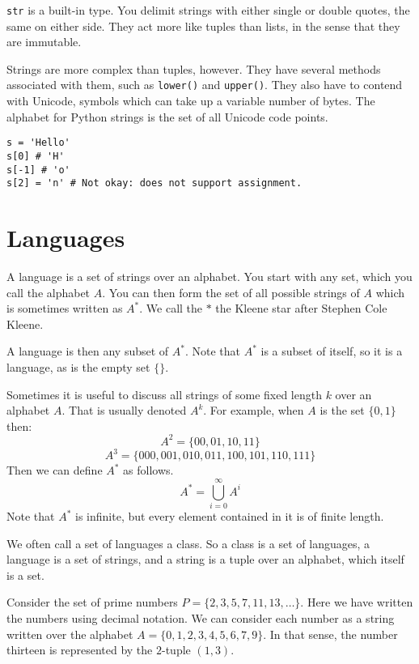 \documentclass{iansnotes}
\begin{document}
   \texttt{str} is a built-in type.
  You delimit strings with either single or double quotes, the same on either side.
  They act more like tuples than lists, in the sense that they are immutable.
  
  Strings are more complex than tuples, however.
  They have several methods associated with them, such as \texttt{lower()} and \texttt{upper()}.
  They also have to contend with Unicode, symbols which can take up a variable number of bytes.
  The alphabet for Python strings is the set of all Unicode code points.

\begin{verbatim}
s = 'Hello'
s[0] # 'H'
s[-1] # 'o'
s[2] = 'n' # Not okay: does not support assignment.
\end{verbatim}

\section{Languages}
  A language is a set of strings over an alphabet\autocite[14]{sipser}.
  You start with any set, which you call the alphabet $A$.
  You can then form the set of all possible strings of $A$ which is sometimes written as $A^*$.
  We call the $*$ the Kleene star after Stephen Cole Kleene.

  A language is then any subset of $A^*$.
  Note that $A^*$ is a subset of itself, so it is a language, as is the empty set $\{\}$.
  
  Sometimes it is useful to discuss all strings of some fixed length $k$ over an alphabet $A$.
  That is usually denoted $A^k$.
  For example, when $A$ is the set $\{0, 1\}$ then:
  \[A^2 = \{ 00, 01, 10, 11 \} \]
  \[A^3 = \{ 000, 001, 010, 011, 100, 101, 110, 111 \} \]
  Then we can define $A^*$ as follows.
  \[A^* = \bigcup_{i=0}^\infty A^i\]
  Note that $A^*$ is infinite, but every element contained in it is of finite length.

  We often call a set of languages a class.
  So a class is a set of languages, a language is a set of strings, and a string is a tuple over an alphabet, which itself is a set.

  Consider the set of prime numbers $P = \{2, 3, 5, 7, 11, 13, \ldots\}$.
  Here we have written the numbers using decimal notation.
  We can consider each number as a string written over the alphabet $A = \{0,1,2,3,4,5,6,7,9\}$.
  In that sense, the number thirteen is represented by the $2$-tuple $(1, 3)$.
\end{document}

